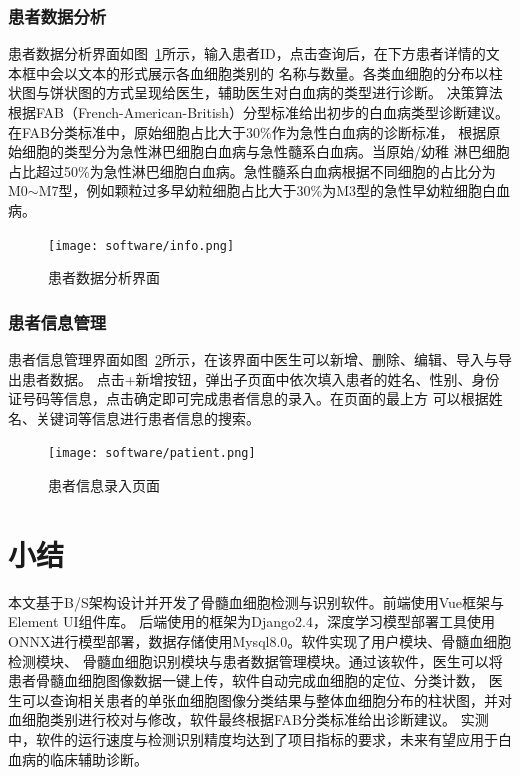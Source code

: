 \subsubsection{患者数据分析}
患者数据分析界面如图~\ref{fig:interface_info}所示，输入患者ID，点击查询后，在下方患者详情的文本框中会以文本的形式展示各血细胞类别的
名称与数量。各类血细胞的分布以柱状图与饼状图的方式呈现给医生，辅助医生对白血病的类型进行诊断。
决策算法根据FAB（French-American-British）分型标准给出初步的白血病类型诊断建议。在FAB分类标准中，原始细胞占比大于30\%作为急性白血病的诊断标准，
根据原始细胞的类型分为急性淋巴细胞白血病与急性髓系白血病。当原始/幼稚
淋巴细胞占比超过50\%为急性淋巴细胞白血病。急性髓系白血病根据不同细胞的占比分为M0$\sim$M7型，例如颗粒过多早幼粒细胞占比大于30\%为M3型的急性早幼粒细胞白血病。
\begin{figure}[htbp]                     
  \centering                      
  \texttt{[image: software/info.png]}                      
  \caption{患者数据分析界面}                      
  \label{fig:interface_info}       
\end{figure}
\subsubsection{患者信息管理}
患者信息管理界面如图~\ref{fig:interface_patient}所示，在该界面中医生可以新增、删除、编辑、导入与导出患者数据。
点击+新增按钮，弹出子页面中依次填入患者的姓名、性别、身份证号码等信息，点击确定即可完成患者信息的录入。在页面的最上方
可以根据姓名、关键词等信息进行患者信息的搜索。
\begin{figure}[htbp]                     
  \centering                      
  \texttt{[image: software/patient.png]}                      
  \caption{患者信息录入页面}                      
  \label{fig:interface_patient}       
\end{figure}
\section{小结}
本文基于B/S架构设计并开发了骨髓血细胞检测与识别软件。前端使用Vue框架与Element UI组件库。
后端使用的框架为Django2.4，深度学习模型部署工具使用ONNX进行模型部署，数据存储使用Mysql8.0。软件实现了用户模块、骨髓血细胞检测模块、
骨髓血细胞识别模块与患者数据管理模块。通过该软件，医生可以将患者骨髓血细胞图像数据一键上传，软件自动完成血细胞的定位、分类计数，
医生可以查询相关患者的单张血细胞图像分类结果与整体血细胞分布的柱状图，并对血细胞类别进行校对与修改，软件最终根据FAB分类标准给出诊断建议。
实测中，软件的运行速度与检测识别精度均达到了项目指标的要求，未来有望应用于白血病的临床辅助诊断。
